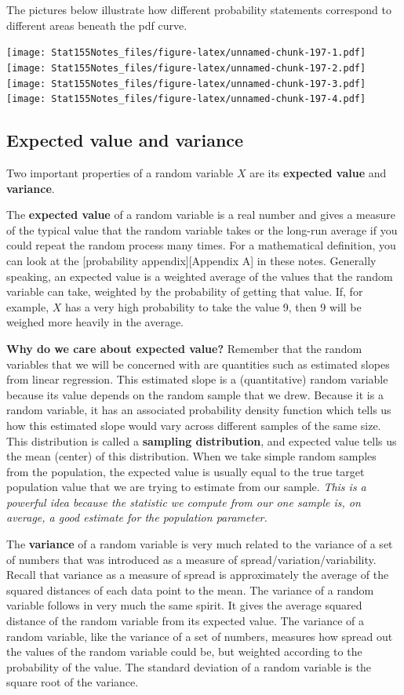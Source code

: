 \documentclass[]{book}
\begin{document}
The pictures below illustrate how different probability statements correspond to different areas beneath the pdf curve.

\texttt{[image: Stat155Notes\_files/figure-latex/unnamed-chunk-197-1.pdf]} \texttt{[image: Stat155Notes\_files/figure-latex/unnamed-chunk-197-2.pdf]} \texttt{[image: Stat155Notes\_files/figure-latex/unnamed-chunk-197-3.pdf]} \texttt{[image: Stat155Notes\_files/figure-latex/unnamed-chunk-197-4.pdf]}

\hypertarget{expected-value-and-variance}{%
\subsection{Expected value and variance}\label{expected-value-and-variance}}

Two important properties of a random variable \(X\) are its \textbf{expected value} and \textbf{variance}.

The \textbf{expected value} of a random variable is a real number and gives a measure of the typical value that the random variable takes or the long-run average if you could repeat the random process many times. For a mathematical definition, you can look at the {[}probability appendix{]}{[}Appendix A{]} in these notes. Generally speaking, an expected value is a weighted average of the values that the random variable can take, weighted by the probability of getting that value. If, for example, \(X\) has a very high probability to take the value 9, then 9 will be weighed more heavily in the average.

\textbf{Why do we care about expected value?} Remember that the random variables that we will be concerned with are quantities such as estimated slopes from linear regression. This estimated slope is a (quantitative) random variable because its value depends on the random sample that we drew. Because it is a random variable, it has an associated probability density function which tells us how this estimated slope would vary across different samples of the same size. This distribution is called a \textbf{sampling distribution}, and expected value tells us the mean (center) of this distribution. When we take simple random samples from the population, the expected value is usually equal to the true target population value that we are trying to estimate from our sample. \emph{This is a powerful idea because the statistic we compute from our one sample is, on average, a good estimate for the population parameter.}

The \textbf{variance} of a random variable is very much related to the variance of a set of numbers that was introduced as a measure of spread/variation/variability. Recall that variance as a measure of spread is approximately the average of the squared distances of each data point to the mean. The variance of a random variable follows in very much the same spirit. It gives the average squared distance of the random variable from its expected value. The variance of a random variable, like the variance of a set of numbers, measures how spread out the values of the random variable could be, but weighted according to the probability of the value. The standard deviation of a random variable is the square root of the variance.
\end{document}
